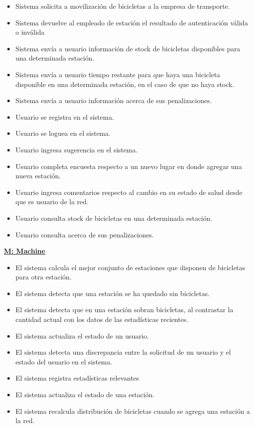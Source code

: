 \begin{itemize}
\item Sistema solicita a movilización de bicicletas a la empresa de transporte.
\item Sistema devuelve al empleado de estación el resultado de autenticación válida o inválida
\item Sistema envía a usuario información de stock de bicicletas disponibles para una determinada estación.
\item Sistema envía a usuario tiempo restante para que haya una bicicleta disponible en una determinada estación, en el caso
de que no haya stock.
\item Sistema envía a usuario información acerca de sus penalizaciones.

\item Usuario se registra en el sistema.
\item Usuario se loguea en el sistema.
\item Usuario ingresa sugerencia en el sistema.
\item Usuario completa encuesta respecto a un nuevo lugar en donde agregar una nueva estación.
\item Usuario ingresa comentarios respecto al cambio en su estado de salud desde que es usuario de la red.
\item Usuario consulta stock de bicicletas en una determinada estación.
\item Usuario consulta acerca de sus penalizaciones.

\end{itemize}


\vspace{1cm}
\textbf{\underline{M: Machine}}

\begin{itemize}
\item El sistema calcula el mejor conjunto de estaciones que disponen de bicicletas para otra estación.
\item El sistema detecta que una estación se ha quedado sin bicicletas.
\item El sistema detecta que en una estación sobran bicicletas, al contrastar la cantidad actual con los datos
de las estadísticas recientes.
\item El sistema actualiza el estado de un usuario.
\item El sistema detecta una discrepancia entre la solicitud de un usuario y el estado del usuario en el sistema.
\item El sistema registra estadísticas relevantes
\item El sistema actualiza el estado de una estación.
\item El sistema recalcula distribución de bicicletas cuando se agrega una estación a la red.
\end{itemize}


